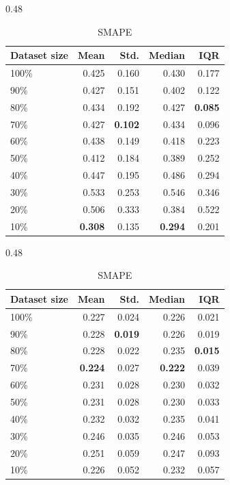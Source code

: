\begin{table}[ht]
\begin{subtable}{0.48\textwidth}
\centering
\small
\caption{MAPE}
\label{tab:mape-catboost-data-size-random-cv}
\begin{tabular}{lrrrr}
\toprule
\textbf{Dataset size} & \textbf{Mean} & \textbf{Std.} & \textbf{Median} & \textbf{IQR} \\
\midrule
100\% & 0.425 & 0.160 & 0.430 & 0.177 \\
90\%  & 0.427 & 0.151 & 0.402 & 0.122 \\
80\%  & 0.434 & 0.192 & 0.427 & \textbf{0.085} \\
70\%  & 0.427 & \textbf{0.102} & 0.434 & 0.096 \\
60\%  & 0.438 & 0.149 & 0.418 & 0.223 \\
50\%  & 0.412 & 0.184 & 0.389 & 0.252 \\
40\%  & 0.447 & 0.195 & 0.486 & 0.294 \\
30\%  & 0.533 & 0.253 & 0.546 & 0.346 \\
20\%  & 0.506 & 0.333 & 0.384 & 0.522 \\
10\%  & \textbf{0.308} & 0.135 & \textbf{0.294} & 0.201 \\
\bottomrule
\end{tabular}
\end{subtable}
\hfill
\begin{subtable}{0.48\textwidth}
\centering
\small
\caption{SMAPE}
\label{tab:smape-catboost-data-size-random-cv}
\begin{tabular}{lrrrr}
\toprule
\textbf{Dataset size} & \textbf{Mean} & \textbf{Std.} & \textbf{Median} & \textbf{IQR} \\
\midrule
100\% & 0.227 & 0.024 & 0.226 & 0.021 \\
90\%  & 0.228 & \textbf{0.019} & 0.226 & 0.019 \\
80\%  & 0.228 & 0.022 & 0.235 & \textbf{0.015} \\
70\%  & \textbf{0.224} & 0.027 & \textbf{0.222} & 0.039 \\
60\%  & 0.231 & 0.028 & 0.230 & 0.032 \\
50\%  & 0.231 & 0.028 & 0.230 & 0.033 \\
40\%  & 0.232 & 0.032 & 0.235 & 0.041 \\
30\%  & 0.246 & 0.035 & 0.246 & 0.053 \\
20\%  & 0.251 & 0.059 & 0.247 & 0.093 \\
10\%  & 0.226 & 0.052 & 0.232 & 0.057 \\
\bottomrule
\end{tabular}
\end{subtable}

\end{table}

